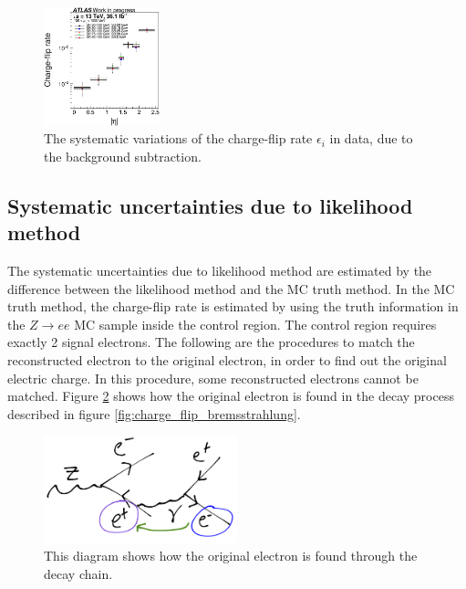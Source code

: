 \begin{figure}
\includegraphics[width=0.3\textwidth]{data/plot/charge_flip/FitPlots/data_cf_comparison_4.eps}
\caption{The systematic variations of the charge-flip rate $\epsilon_i$ in data, due to the background subtraction.}
\label{fig:charge_flip_sys_background_subtraction}
\end{figure}

\subsection{Systematic uncertainties due to likelihood method}
\label{sec:sys_likelihood}
The systematic uncertainties due to likelihood method are estimated by the difference between the likelihood method and the MC truth method.
In the MC truth method, the charge-flip rate is estimated by using the truth information in the $Z \rightarrow ee$ MC sample inside the control region.
The control region requires exactly 2 signal electrons.
The following are the procedures to match the reconstructed electron to the original electron, in order to find out the original electric charge.
In this procedure, some reconstructed electrons cannot be matched.
Figure \ref{fig:charge_flip_MC_match} shows how the original electron is found in the decay process described in figure \ref{fig:charge_flip_bremsstrahlung}.
\begin{figure}
\centering
\includegraphics[width=0.5\textwidth]{data/photo/charge_flip/MC-truth.png}
\caption{This diagram shows how the original electron is found through the decay chain.}
\label{fig:charge_flip_MC_match}
\end{figure}
